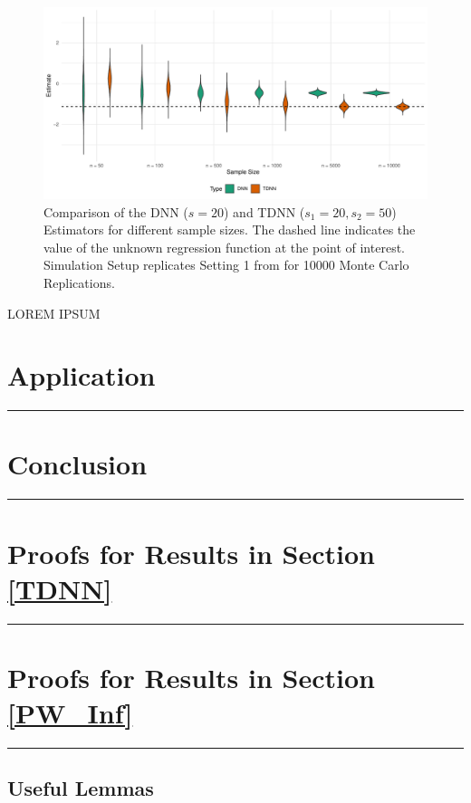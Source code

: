 \documentclass[letterpaper,10pt]{article}
\numberwithin{equation}{section}
\numberwithin{thm}{section}
\numberwithin{lem}{section}
\numberwithin{cor}{section}
\newcommand{\1}{\mathbb{1}}
\begin{document}
\begin{figure}[H]
	\includegraphics[width = \textwidth]{../Code/Simulations/Graphics/TDNN_DNN.pdf}
	\caption{Comparison of the DNN ($s = 20$) and TDNN ($s_1 = 20, s_2 = 50$) Estimators for different sample sizes.
		The dashed line indicates the value of the unknown regression function at the point of interest.
		Simulation Setup replicates Setting 1 from \citet{demirkaya_optimal_2024} for 10000 Monte Carlo Replications.}
\end{figure}

{\color{red} LOREM IPSUM}


\section{Application}\label{Application}
\hrule

\section{Conclusion}\label{Conclusion}
\hrule

\newpage
\printbibliography

\appendix

\section{Proofs for Results in Section \ref{TDNN}}
\hrule


\section{Proofs for Results in Section \ref{PW_Inf}}
\hrule
\subsection{Useful Lemmas}
\end{document}
